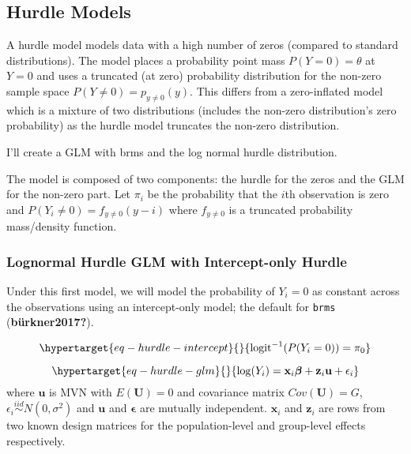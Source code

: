 \documentclass[
  letterpaper,
  DIV=11,
  numbers=noendperiod]{scrartcl}
\begin{document}
\hypertarget{hurdle-models}{%
\subsection{Hurdle Models}\label{hurdle-models}}

A hurdle model models data with a high number of zeros (compared to
standard distributions). The model places a probability point mass
\(P(Y = 0) = \theta\) at \(Y = 0\) and uses a truncated (at zero)
probability distribution for the non-zero sample space
\(P(Y \neq 0) = p_{y \neq 0}(y)\). This differs from a zero-inflated
model which is a mixture of two distributions (includes the non-zero
distribution's zero probability) as the hurdle model truncates the
non-zero distribution.

I'll create a GLM with brms and the log normal hurdle distribution.

The model is composed of two components: the hurdle for the zeros and
the GLM for the non-zero part. Let \(\pi_i\) be the probability that the
\(i\)th observation is zero and \(P(Y_i \neq 0) = f_{y\neq 0}(y-i)\)
where \(f_{y\neq 0}\) is a truncated probability mass/density function.

\hypertarget{lognormal-hurdle-glm-with-intercept-only-hurdle}{%
\subsubsection{Lognormal Hurdle GLM with Intercept-only
Hurdle}\label{lognormal-hurdle-glm-with-intercept-only-hurdle}}

Under this first model, we will model the probability of \(Y_i = 0\) as
constant across the observations using an intercept-only model; the
default for \texttt{brms} (\textbf{bürkner2017?}).

\begin{equation}\protect\hypertarget{eq-hurdle-intercept}{}{
\mathrm{logit}^{-1}(P(Y_i = 0)) = \pi_0
}\label{eq-hurdle-intercept}\end{equation}

\begin{equation}\protect\hypertarget{eq-hurdle-glm}{}{
\log(Y_i) = \mathbf{x}_i \boldsymbol{\beta} + \mathbf{z}_i \mathbf{u} + \epsilon_i
}\label{eq-hurdle-glm}\end{equation} where \(\mathbf{u}\) is MVN with
\(E(\mathbf{U}) = 0\) and covariance matrix \(Cov(\mathbf{U}) = G\),
\(\epsilon_i \overset{iid}{\sim} N(0, \sigma^2)\) and \(\mathbf{u}\) and
\(\boldsymbol{\epsilon}\) are mutually independent. \(\mathbf{x}_i\) and
\(\mathbf{z}_i\) are rows from two known design matrices for the
population-level and group-level effects respectively.
\end{document}

